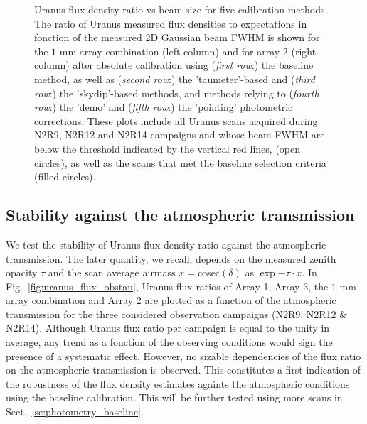 \begin{figure}[ht!]
\begin{center}
    \caption[Uranus flux density stability against FWHM]{
      Uranus flux density ratio vs beam size for five
      calibration methods. The ratio of 
      Uranus measured flux densities to expectations in fonction of the
      measured 2D Gaussian beam FWHM is shown for the $1$-mm array
      combination (left column) and for array 2 (right column) after absolute
      calibration using (\emph{first row}:) the baseline method, as
      well as (\emph{second row}:) the 'taumeter'-based and
      (\emph{third row}:) the 'skydip'-based methods, and methods
      relying to (\emph{fourth row}:) the 'demo' and (\emph{fifth
        row}:) the 'pointing' photometric corrections. These plots
      include all Uranus scans acquired during N2R9, N2R12 and N2R14
      campaigns and whose beam FWHM are below the threshold indicated
      by the vertical red lines, (open circles), as
      well as the scans that met the baseline selection criteria (filled
      circles).}
\label{fig:calib_uranus_vs_fwhm_all}
\end{center}
\end{figure}


\subsection{Stability against the atmospheric transmission}

We test the stability of Uranus flux density ratio
against the atmospheric transmission. The later quantity, we
recall, depends on the measured zenith opacity $\tau$ and the scan
average airmass $x = $cosec$(\delta)$ as $\exp{-\tau \cdot x}$. In
Fig.~\ref{fig:uranus_flux_obstau}, Uranus flux ratios of Array 1,
Array 3, the $1$-mm array combination and Array 2 are plotted as a
function of the atmospheric transmission for the three considered
observation campaigns (N2R9, N2R12 $\&$ N2R14). Although Uranus flux
ratio per campaign is equal to the unity in average, any trend as
a fonction of the observing conditions would sign the presence of a
systematic effect. However, no sizable dependencies of the flux ratio
on the atmospheric transmission is observed. This constitutes a first
indication of the robustness of the flux density estimates againts the
atmospheric conditions using the baseline calibration. This will be
further tested using more scans in Sect.~\ref{se:photometry_baseline}.   


